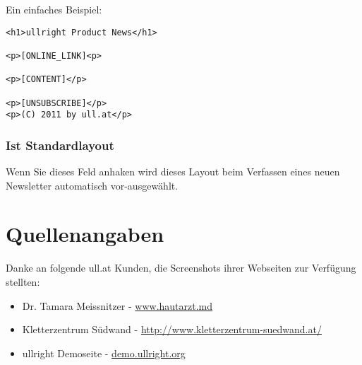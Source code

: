 \documentclass[article, a4paper, oneside, 11pt]{memoir}
\begin{document}
Ein einfaches Beispiel:

\begin{lstlisting}
<h1>ullright Product News</h1>

<p>[ONLINE_LINK]<p>

<p>[CONTENT]</p>

<p>[UNSUBSCRIBE]</p>
<p>(C) 2011 by ull.at</p>
\end{lstlisting}

\subsection{Ist Standardlayout}

Wenn Sie dieses Feld anhaken wird dieses Layout beim Verfassen eines neuen Newsletter automatisch vor-ausgewählt.





\chapter{Quellenangaben}

Danke an folgende ull.at Kunden, die Screenshots ihrer Webseiten zur Verfügung stellten:

\begin{itemize}
\item Dr. Tamara Meissnitzer - \href{http://www.hautarzt.md}{www.hautarzt.md}
\item Kletterzentrum Südwand - \href{http://http://www.kletterzentrum-suedwand.at/}{http://www.kletterzentrum-suedwand.at/}
\item ullright Demoseite - \href{http://demo.ullright.org}{demo.ullright.org}
\end{itemize}
\end{document}
